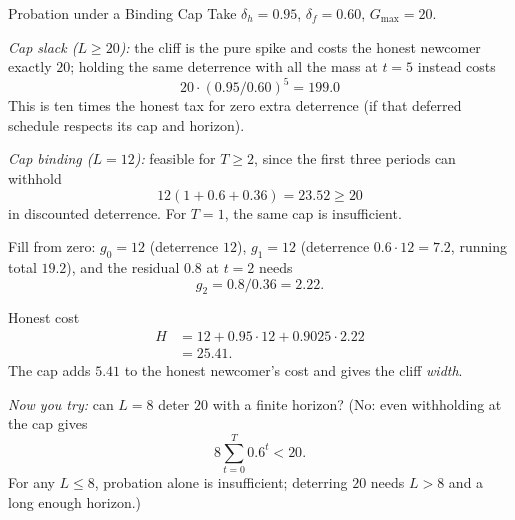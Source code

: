 \documentclass[11pt,a4paper]{article}
\theoremstyle{definition}
\begin{document}
\begin{pdexample}{Probation under a Binding Cap}
\setlength{\parskip}{4pt plus 1pt}
\label{ex:binding-probation}
Take $\delta_h=0.95$, $\delta_f=0.60$,
$G_{\max}=20$.

\emph{Cap slack ($L\ge 20$):} the cliff is the pure spike and costs
the honest newcomer exactly $20$; holding the same deterrence with all the mass at
$t=5$ instead costs
\[
20\cdot(0.95/0.60)^5 = 199.0
\]
This is ten times the honest tax for
zero extra deterrence (if that deferred schedule respects its cap and horizon).

\emph{Cap binding ($L=12$):} feasible for $T\ge2$, since the first three
periods can withhold
\[
12(1+0.6+0.36)=23.52\ge20
\]
in discounted deterrence.
For $T=1$, the same cap is insufficient.

Fill from zero: $g_0=12$ (deterrence $12$),
$g_1=12$ (deterrence $0.6\cdot 12=7.2$, running total $19.2$), and the residual
$0.8$ at $t=2$ needs
\[
g_2=0.8/0.36=2.22.
\]

Honest cost
\[
\begin{aligned}
H &= 12 + 0.95\cdot 12 + 0.9025\cdot 2.22\\
&= 25.41.
\end{aligned}
\]
The cap adds $5.41$ to the honest newcomer's cost and gives the cliff
\emph{width}.

\emph{Now you try:} can $L=8$ deter $20$ with a finite horizon?
(No: even withholding at the cap gives
\[
8\sum_{t=0}^{T}0.6^t<20.
\]
For any $L\le 8$, probation alone is insufficient; deterring $20$ needs
$L>8$ and a long enough horizon.)
\end{pdexample}
\end{document}
